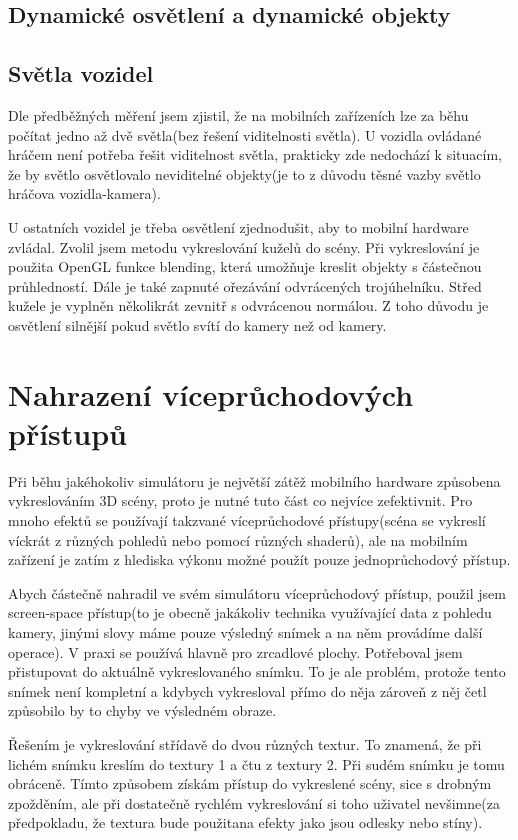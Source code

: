 \documentclass[11pt,twoside,a4paper]{book}
\begin{document}
\subsection{Dynamické osvětlení a dynamické objekty}

\subsection{Světla vozidel}

Dle předběžných měření jsem zjistil, že na mobilních zařízeních lze za běhu počítat jedno až dvě světla(bez řešení viditelnosti světla). U vozidla ovládané hráčem není potřeba řešit viditelnost světla, prakticky zde nedochází k situacím, že by světlo osvětlovalo neviditelné objekty(je to z důvodu těsné vazby světlo hráčova vozidla-kamera).

U ostatních vozidel je třeba osvětlení zjednodušit, aby to mobilní hardware zvládal. Zvolil jsem metodu vykreslování kuželů do scény. Při vykreslování je použita OpenGL funkce blending, která umožňuje kreslit objekty s částečnou průhledností. Dále je také zapnuté ořezávání odvrácených trojúhelníku. Střed kužele je vyplněn několikrát zevnitř s odvrácenou normálou. Z toho důvodu je osvětlení silnější pokud světlo svítí do kamery než od kamery.

\section{Nahrazení víceprůchodových přístupů}
Při běhu jakéhokoliv simulátoru je největší zátěž mobilního hardware způsobena vykreslováním 3D scény, proto je nutné tuto část co nejvíce zefektivnit. Pro mnoho efektů se používají takzvané víceprůchodové přístupy(scéna se vykreslí víckrát z různých pohledů nebo pomocí různých shaderů), ale na mobilním zařízení je zatím z hlediska výkonu možné použít pouze jednoprůchodový přístup.

Abych částečně nahradil ve svém simulátoru víceprůchodový přístup, použil jsem screen-space přístup(to je obecně jakákoliv technika využívající data z pohledu kamery, jinými slovy máme pouze výsledný snímek a na něm provádíme další operace). V praxi se používá hlavně pro zrcadlové plochy. Potřeboval jsem přistupovat do aktuálně vykreslovaného snímku. To je ale problém, protože tento snímek není kompletní a kdybych vykresloval přímo do něj\linebreak a zároveň z něj četl způsobilo by to chyby ve výsledném obraze.

Řešením je vykreslování střídavě do dvou různých textur. To znamená, že při lichém snímku kreslím do textury 1 a čtu z textury 2. Při sudém snímku je tomu obráceně. Tímto způsobem získám přístup do vykreslené scény, sice s drobným zpožděním, ale při dostatečně rychlém vykreslování si toho uživatel nevšimne(za předpokladu, že textura bude použita\linebreak na efekty jako jsou odlesky nebo stíny).
\end{document}
